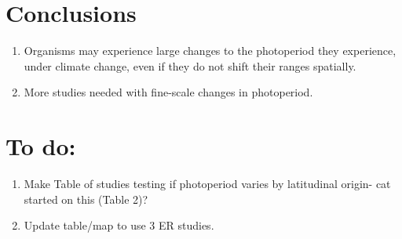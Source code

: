 \documentclass{article}
\begin{document}
\section*{Conclusions}
\begin{enumerate}
\item Organisms may experience large changes to the photoperiod they experience, under climate change, even if they do not shift their ranges spatially.
\item More studies needed with fine-scale changes in photoperiod.
\end{enumerate}

\section* {To do:}
\begin{enumerate}
\item Make Table of studies testing if photoperiod varies by latitudinal origin- cat started on this (Table 2)?
\item Update table/map to use 3 ER studies.
\end{enumerate}
\end{document}
